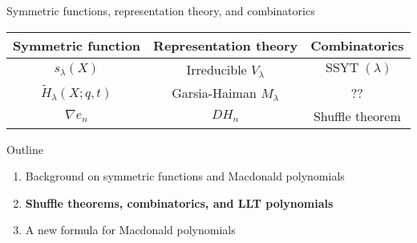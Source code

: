 \documentclass[dvipsnames]{beamer}
\newcommand{\Htild}{\tilde{H}}
\DeclareMathOperator{\SSYT}{SSYT}
\theoremstyle{definition}
\newcounter{c}
\begin{document}
  \begin{frame}{Symmetric functions, representation theory, and combinatorics}
    \begin{tabular}{ccc}
      Symmetric function & Representation theory & Combinatorics 
      \\
      \hline
      \(s_\lambda(X)\) & Irreducible \(V_\lambda\) & \(\SSYT(\lambda)\) \\
      \(\Htild_\lambda(X;q,t)\) & Garsia-Haiman \(M_\lambda\) & ?? \\
      \(\nabla e_n\) & \(DH_n\) & Shuffle theorem
    \end{tabular}
  \end{frame}
\begin{frame}{Outline}
  \begin{enumerate}
  \item Background on symmetric functions and Macdonald polynomials
  \item {\bf Shuffle theorems, combinatorics, and LLT polynomials}
  \item A new formula for Macdonald polynomials
  \end{enumerate}
\end{frame}
\end{document}
